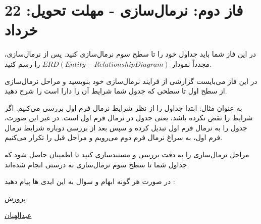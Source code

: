\documentclass[12pt]{article}
\begin{document}
\fontsize{12pt}{14pt}\selectfont




\renewcommand{\abstractname}{طراحی پایگاه داده فروشگاه آنلاین}


\section{فاز دوم: نرمال‌سازی  - مهلت تحویل: 22 خرداد}

در این فاز شما باید جداول خود را تا سطح سوم نرمال‌سازی کنید. پس از نرمال‌سازی، مجدداً نمودار \(ERD (Entity-Relationship Diagram)\) را رسم کنید.

در این فاز می‌بایست گزارشی از فرایند نرمال‌سازی خود بنویسید و مراحل نرمال‌سازی از سطح اول تا سطحی که جدول شما شرایط آن را دارا است را شرح دهید.

به عنوان مثال:
ابتدا جداول را از نظر شرایط نرمال فرم اول بررسی می‌کنیم. اگر شرایط را نقض نکرده باشد، یعنی جدول در نرمال فرم اول است. در غیر این صورت، جدول را به نرمال فرم اول تبدیل کرده و سپس بعد از بررسی دوباره شرایط نرمال فرم اول، به سراغ نرمال فرم دوم می‌رویم و مراحل قبل را تکرار می‌کنیم.

مراحل نرمال‌سازی را به دقت بررسی و مستندسازی کنید تا اطمینان حاصل شود که جداول شما تا سطح سوم نرمال‌سازی به درستی انجام شده‌اند.



در صورت هر گونه ابهام و سوال به این ایدی ها پیام دهید :‌

\href{https://t.me/Ali_Abdollahian_Noghabi}{پرورش}

\href{https://t.me/parvvaresh}{‫ﻋﺒﺪﺍﻟﻬﻴﺎﻥ‬}
\end{document}
